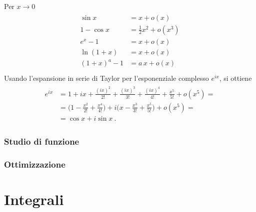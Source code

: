 \documentclass[letterpaper,10pt,italian]{jupyterBook}
\begin{document}
\sphinxAtStartPar
{}
Per \(x \rightarrow 0\)
\begin{equation*}
\begin{split}\begin{aligned}
  \sin x      & = x +o(x) \\
  1 - \cos x  & = \frac{1}{2} x^2 + o(x^3) \\
  e^x - 1     & = x + o(x) \\
  \ln(1+x)    & = x + o(x) \\
  (1+x)^a - 1 & = a \, x + o(x) \\
\end{aligned}\end{split}
\end{equation*}
\sphinxAtStartPar
{} Usando l’espansione in serie di Taylor per l’esponenziale complesso \(e^{ix}\), si ottiene
\begin{equation*}
\begin{split}\begin{aligned}
e^{ix} & = 1 + ix + \frac{(ix)^2}{2!} + \frac{(ix)^3}{3!} + \frac{(ix)^4}{4!} + \frac{x^5}{5!} + o(x^5) = \\
& = \Big( 1 - \frac{x^2}{2!} + \frac{x^4}{4!} \Big) + i \Big( x - \frac{x^3}{3!} + \frac{x^5}{5!} \Big) + o(x^5) = \\
& = \cos x + i \sin x \ .
\end{aligned}\end{split}
\end{equation*}

\subsubsection{Studio di funzione}
\label{\detokenize{ch/infinitesimal_calculus/derivatives:studio-di-funzione}}

\subsubsection{Ottimizzazione}
\label{\detokenize{ch/infinitesimal_calculus/derivatives:ottimizzazione}}
\sphinxstepscope


\section{Integrali}
\label{\detokenize{ch/infinitesimal_calculus/integrals:integrali}}\label{\detokenize{ch/infinitesimal_calculus/integrals:infinitesimal-calculus-integrals}}\label{\detokenize{ch/infinitesimal_calculus/integrals::doc}}
\end{document}

